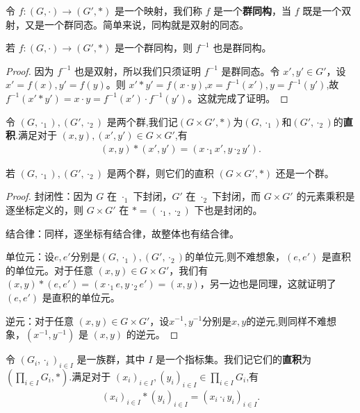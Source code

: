\documentclass[../../main.tex]{subfiles}
\begin{document}
\begin{definition}[群同构]
令 $f:(G,\cdot)\to (G',*)$ 是一个映射，我们称 $f$ 是一个\textbf{群同构}，当 $f$ 既是一个双射，又是一个群同态。简单来说，同构就是双射的同态。
\end{definition}

\begin{proposition}[群同构的逆也是群同构]\label{proposition:群同构的逆也是群同构}
若 $f:(G,\cdot)\to (G',*)$ 是一个群同构，则 $f^{-1}$ 也是群同构。
\end{proposition}
\begin{proof}
因为 $f^{-1}$ 也是双射，所以我们只须证明 $f^{-1}$ 是群同态。令 $x',y'\in G'$，设 $x' = f(x),y' = f(y)$。则 $x'*y' = f(x\cdot y)$,$x=f^{-1}(x'),y=f^{-1}(y')$,故 $f^{-1}(x'*y')=x\cdot y = f^{-1}(x')\cdot f^{-1}(y')$。这就完成了证明。 
\end{proof}

\begin{definition}[两个群的直积]
令 $(G,\cdot_1),(G',\cdot_2)$ 是两个群,我们记$(G\times G',*)$为$(G,\cdot_1)$和$(G',\cdot_2)$的\textbf{直积}.满足对于 $(x,y),(x',y')\in G\times G'$,有
\begin{align*}
(x,y)*(x',y')=(x\cdot_1 x',y\cdot_2 y').
\end{align*}
\end{definition}

\begin{proposition}[两个群的直积仍是群]\label{proposition:两个群的直积仍是群}
若 $(G,\cdot_1),(G',\cdot_2)$ 是两个群，则它们的直积 $(G\times G',*)$ 还是一个群。
\end{proposition}
\begin{proof}
封闭性：因为 $G$ 在 $\cdot_1$ 下封闭，$G'$ 在 $\cdot_2$ 下封闭，而 $G\times G'$ 的元素乘积是逐坐标定义的，则 $G\times G'$ 在 $* = (\cdot_1,\cdot_2)$ 下也是封闭的。

结合律：同样，逐坐标有结合律，故整体也有结合律。

单位元：设$e,e'$分别是$(G,\cdot_1),(G',\cdot_2)$的单位元,则不难想象，$(e,e')$ 是直积的单位元。对于任意 $(x,y)\in G\times G'$，我们有 $(x,y)*(e,e')=(x\cdot_1 e,y\cdot_2 e')=(x,y)$，另一边也是同理，这就证明了 $(e,e')$ 是直积的单位元。

逆元：对于任意 $(x,y)\in G\times G'$，设$x^{-1},y^{-1}$分别是$x,y$的逆元,则同样不难想象，$(x^{-1},y^{-1})$ 是 $(x,y)$ 的逆元。 
\end{proof}

\begin{definition}[一族群的直积]
令 $(G_i,\cdot_i)_{i\in I}$ 是一族群，其中 $I$ 是一个指标集。我们记它们的\textbf{直积}为 $(\prod_{i\in I}G_i,*)$.满足对于 $(x_i)_{i\in I},(y_i)_{i\in I}\in\prod_{i\in I}G_i$,有
\begin{align*}
(x_i)_{i\in I}*(y_i)_{i\in I}=(x_i\cdot_i y_i)_{i\in I}.
\end{align*}
\end{definition}
\end{document}
